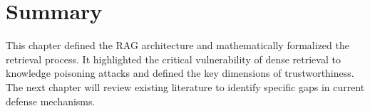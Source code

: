 \section{Summary}
This chapter defined the RAG architecture and mathematically formalized the retrieval process. It highlighted the critical vulnerability of dense retrieval to knowledge poisoning attacks and defined the key dimensions of trustworthiness. The next chapter will review existing literature to identify specific gaps in current defense mechanisms.